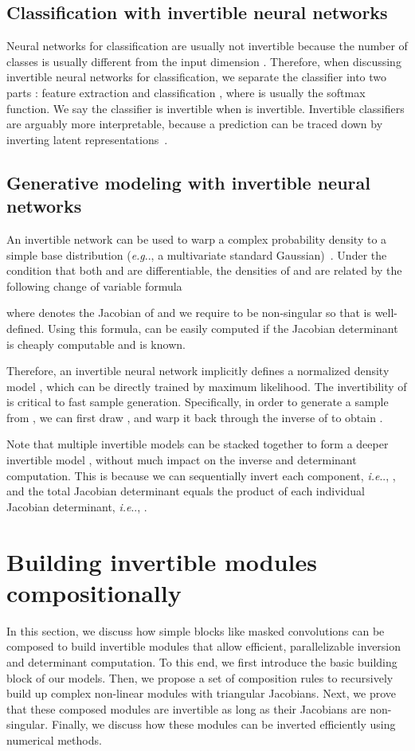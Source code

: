 \documentclass{article}
\makeatletter
\def\@onedot{\ifx\@let@token.\else.\null\fi\xspace}
\DeclareRobustCommand\onedot{\futurelet\@let@token\@onedot}
\def\eg{\emph{e.g}\onedot}
\def\ie{\emph{i.e}\onedot}
\makeatother
\begin{document}
\subsection{Classification with invertible neural networks}

Neural networks for classification are usually not invertible
because the number of classes  is usually different from the input dimension . Therefore, when discussing invertible neural networks for classification, we separate the classifier into two parts : feature extraction  and classification , where  is usually the softmax function. We say the classifier is invertible when  is invertible.
Invertible classifiers are arguably more interpretable, because a prediction can be traced down by inverting latent representations~\cite{jacobsen2018irevnet, jacobsen2018excessive}. 



\subsection{Generative modeling with invertible neural networks}
An invertible network  can be used to warp a complex probability density  to a simple base distribution  (\eg, a multivariate standard Gaussian)~\cite{dinh2016density,nvp}.
Under the condition that both  and  are differentiable, the densities of  and  are related by the following change of variable formula

where  denotes the Jacobian of  and we require  to be non-singular so that  is well-defined. Using this formula,  can be easily computed if the Jacobian determinant  is cheaply computable and  is known.

Therefore, an invertible neural network  implicitly defines a normalized density model , which can be directly trained by maximum likelihood. The invertibility of  is critical to fast sample generation. Specifically, in order to generate a sample  from , we can first draw , and warp it back through the inverse of  to obtain . 


Note that multiple invertible models  can be stacked together to form a deeper invertible model , without much impact on the inverse and determinant computation. This is because we can sequentially invert each component, \ie, , and the total Jacobian determinant equals the product of each individual Jacobian determinant, \ie, .
 \section{Building invertible modules compositionally}\label{sec:composition}
In this section, we discuss how simple blocks like masked convolutions can be composed to build invertible modules that allow efficient, parallelizable inversion and determinant computation. To this end, we first introduce the basic building block of our models. Then, we propose a set of composition rules to recursively build up complex non-linear modules with triangular Jacobians. Next, we prove that these composed modules are invertible as long as their Jacobians are non-singular. Finally, we discuss how these modules can be inverted efficiently using numerical methods.
\end{document}
